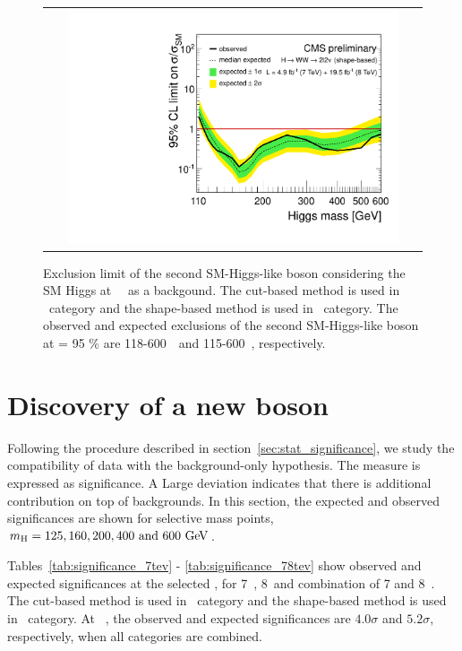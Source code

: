 \begin{figure}[htp] 
\centering 
\begin{tabular}{c} 
\includegraphics[width=0.9\textwidth]{figures/ana_Moriond13_2D_SMH_7p8TeV_bdt_from110to600_logx1_logy1.pdf} 
\end{tabular} 
\caption{Exclusion limit of the second SM-Higgs-like boson considering the 
SM Higgs at ~\GeV\ as a backgound.
The cut-based method is used in \SF\ category and the shape-based method 
is used in \DF\ category.
The observed and expected exclusions of the second SM-Higgs-like boson at \CLs = 95 \% 
are 118-600~\GeV\ and 115-600~\GeV, respectively.} 
\label{fig:limit78_secondhiggs} 
\end{figure} 




\section{Discovery of a new boson}

Following the procedure described in section~\ref{sec:stat_significance}, 
we study the compatibility of data with the background-only hypothesis. 
The measure is expressed as significance. A Large deviation indicates 
that there is additional contribution on top of backgrounds. 
In this section, the expected and observed significances are shown
for selective mass points, $m_{\mathrm{H}} = 125, 160, 200, 400 \textrm{ and } 600~\mathrm{Ge\kern -0.1em V}$.  

Tables~\ref{tab:significance_7tev} - \ref{tab:significance_78tev}  
show observed and expected significances at the selected \mHi, 
for 7~\TeV, 8~\TeV and combination of 7 and 8~\TeV.
The cut-based method is used in \SF\ category 
and the shape-based method is used in \DF\ category.
At ~\GeV, the observed and expected significances
are $4.0\sigma$ and $5.2\sigma$, respectively, 
when all categories are combined.

